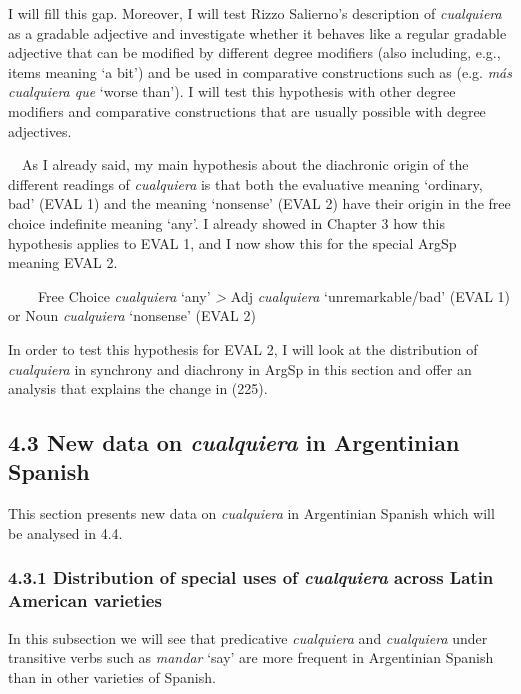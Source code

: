 \begin{styleStandard}
I will fill this gap. Moreover, I will test Rizzo Salierno’s description of \textit{cualquiera} as a gradable adjective and investigate whether it behaves like a regular gradable adjective that can be modified by different degree modifiers (also including, e.g., items meaning ‘a bit’) and be used in comparative constructions such as (e.g. \textit{más cualquiera que} ‘worse than’). I will test this hypothesis with other degree modifiers and comparative constructions that are usually possible with degree adjectives.
\end{styleStandard}

\begin{styleStandard}
\ \ As I already said, my main hypothesis about the diachronic origin of the different readings of \textit{cualquiera} is that both the evaluative meaning ‘ordinary, bad’ (EVAL 1) and the meaning ‘nonsense’ (EVAL 2) have their origin in the free choice indefinite meaning ‘any’. I already showed in Chapter 3 how this hypothesis applies to EVAL 1, and I now show this for the special ArgSp meaning EVAL 2.
\end{styleStandard}

\begin{styleStandard}
\textbf{\ \ }\ \ Free Choice \textit{cualquiera }‘any’ \textit{{\textgreater} }Adj \textit{cualquiera }‘unremarkable/bad’ (EVAL 1) or Noun \textit{cualquiera} ‘nonsense’ (EVAL 2)
\end{styleStandard}

\begin{styleStandard}
In order to test this hypothesis for EVAL 2, I will look at the distribution of \textit{cualquiera} in synchrony and diachrony in ArgSp in this section and offer an analysis that explains the change in (225). 
\end{styleStandard}

\subsection[4.3 New data on cualquiera in Argentinian Spanish]{\textbf{4.3 New data on }\textbf{\textit{cualquiera }}\textbf{in Argentinian Spanish}}
\begin{styleStandard}
This section presents new data on \textit{cualquiera} in Argentinian Spanish which will be analysed in 4.4.
\end{styleStandard}

\subsubsection[4.3.1 Distribution of special uses of cualquiera across Latin American varieties]{\textbf{4.3.1 Distribution of special uses of }\textbf{\textit{cualquiera }}\textbf{across Latin American varieties}}
\begin{styleStandard}
In this subsection we will see that predicative \textit{cualquiera} and \textit{cualquiera} under transitive verbs such as \textit{mandar} ‘say’ are more frequent in Argentinian Spanish than in other varieties of Spanish.
\end{styleStandard}

